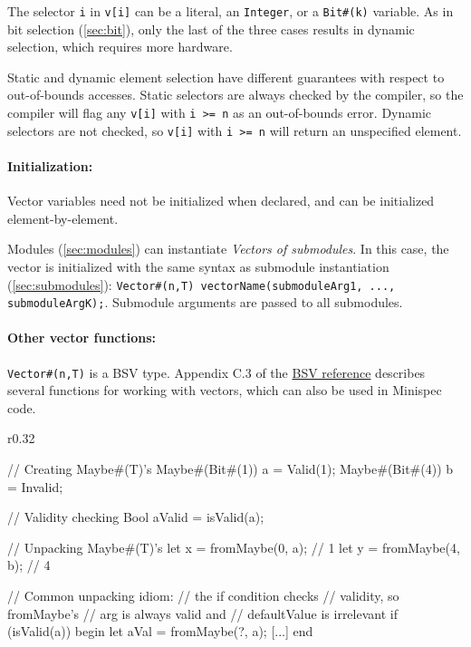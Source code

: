 The selector \verb|i| in \verb|v[i]| can be a literal, an \verb|Integer|, or a \verb|Bit#(k)| variable.
As in bit selection (\autoref{sec:bit}), only the last of the three cases results in dynamic selection,
which requires more hardware.

Static and dynamic element selection have different guarantees with respect to out-of-bounds accesses.
Static selectors are always checked by the compiler,
so the compiler will flag any \verb|v[i]| with \verb|i >= n| as an out-of-bounds error.
Dynamic selectors are not checked, so \verb|v[i]| with \verb|i >= n| will return an unspecified element.

\paragraph{Initialization:} Vector variables need not be initialized when declared,
and can be initialized element-by-element.

Modules (\autoref{sec:modules}) can instantiate \emph{Vectors of submodules}.
In this case, the vector is initialized with the same syntax as submodule instantiation (\autoref{sec:submodules}):
\verb|Vector#(n,T) vectorName(submoduleArg1, ..., submoduleArgK);|. Submodule arguments are passed to all submodules.

\paragraph{Other vector functions:} \verb|Vector#(n,T)| is a BSV type.
Appendix C.3 of the \href{http://csg.csail.mit.edu/6.S078/6_S078_2012_www/resources/reference-guide.pdf}{BSV reference}
describes several functions for working with vectors,
which can also be used in Minispec code.

\newpage

\begin{wrapfigure}{r}{0.32\columnwidth}
\vspace{-4em}
\begin{mscode}
// Creating Maybe#(T)'s
Maybe#(Bit#(1)) a = Valid(1);
Maybe#(Bit#(4)) b = Invalid;

// Validity checking
Bool aValid = isValid(a);

// Unpacking Maybe#(T)'s
let x = fromMaybe(0, a); // 1
let y = fromMaybe(4, b); // 4

// Common unpacking idiom:
// the if condition checks
// validity, so fromMaybe's
// arg is always valid and
// defaultValue is irrelevant
if (isValid(a)) begin
  let aVal = fromMaybe(?, a);
  [...]
end
\end{mscode}
\vspace{-5em}
\end{wrapfigure}

